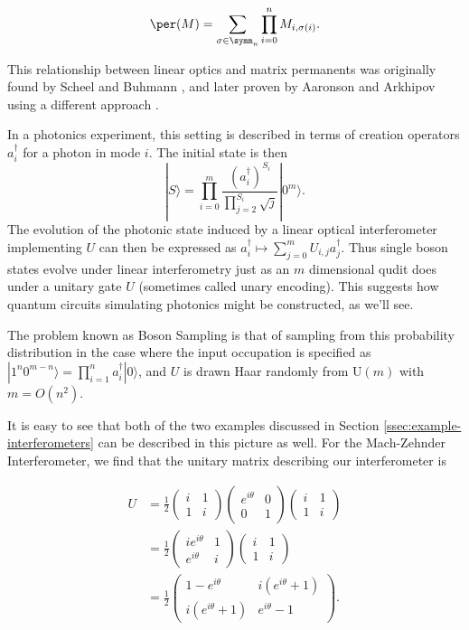 \begin{equation}
\per(M) = \sum_{\sigma\in\symm_n}\prod_{i=0}^nM_{i,\sigma(i)}.
\end{equation}

This relationship between linear optics and matrix permanents was originally found by Scheel and Buhmann \cite{scheel2008}, and later proven by Aaronson and Arkhipov using a different approach \cite{aaronson2011}.

In a photonics experiment, this setting is described in terms of creation operators $a^\dag_i$ for a photon in mode $i$. 
The initial state is then
\begin{equation}
|S\rangle = \prod_{i=0}^m \frac{(a_i^\dagger)^{S_i}}{\prod_{j=2}^{S_i}\sqrt{j}}|0^m\rangle.
\end{equation}
The evolution of the photonic state induced by a linear optical interferometer implementing $U$ can then be expressed as $a_i^\dagger \mapsto \sum_{j = 0}^m U_{i,j}a_j^\dagger$.
Thus single boson states evolve under linear interferometry just as an $m$ dimensional qudit does under a unitary gate $U$ (sometimes called unary encoding).
This suggests how quantum circuits simulating photonics might be constructed, as we'll see.

The problem known as Boson Sampling is that of sampling from this probability distribution in the case where the input occupation is specified as $|1^n 0^{m - n}\rangle = \prod_{i = 1}^n a_{i}^\dagger|0\rangle$, and $U$ is drawn Haar randomly from U$(m)$ with $m=O(n^2)$\cite{aaronson2011}.

It is easy to see that both of the two examples discussed in Section \ref{ssec:example-interferometers} can be described in this picture as well. For the Mach-Zehnder Interferometer, we find that the unitary matrix describing our interferometer is

\begin{align}
U &= \frac{1}{2}\begin{pmatrix}i&1\\1&i\end{pmatrix}\begin{pmatrix}e^{i\theta}&0\\0&1\end{pmatrix}\begin{pmatrix}i&1\\1&i\end{pmatrix}\\
&= \frac{1}{2}\begin{pmatrix}ie^{i\theta}&1\\e^{i\theta}&i\end{pmatrix}\begin{pmatrix}i&1\\1&i\end{pmatrix}\\
&= \frac{1}{2}\begin{pmatrix}1-e^{i\theta}&i(e^{i\theta}+1)\\i(e^{i\theta}+1)&e^{i\theta}-1\end{pmatrix}.
\end{align}

